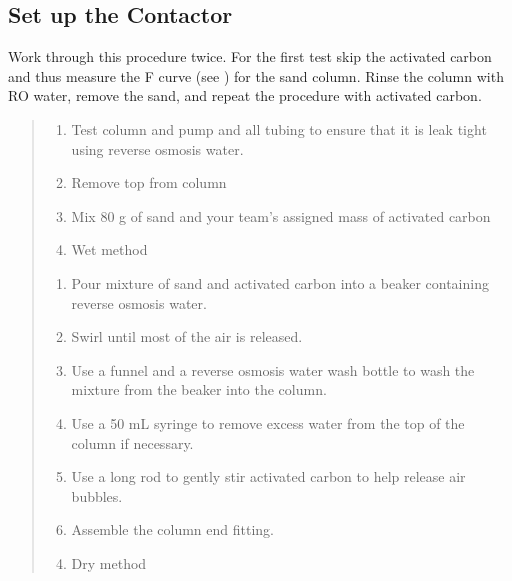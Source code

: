 \documentclass[letterpaper,10pt,english]{sphinxmanual}
\begin{document}
\subsection{Set up the Contactor}
\label{\detokenize{Adsorption/Adsorption:set-up-the-contactor}}
Work through this procedure twice. For the first test skip the activated carbon and thus measure the F curve (see {\hyperref[\detokenize{Reactor_Characteristics/Reactor_Characteristics:heading-reactor-modeling}]{}}) for the sand column. Rinse the column with RO water, remove the sand, and repeat the procedure with activated carbon.
\begin{quote}
\begin{enumerate}
\item {} 
Test column and pump and all tubing to ensure that it is leak tight using reverse osmosis water.

\item {} 
Remove top from column

\item {} 
Mix 80 g of sand and your team’s assigned mass of activated carbon

\item {} 
Wet method

\end{enumerate}
\begin{enumerate}
\item {} 
Pour mixture of sand and activated carbon into a beaker containing reverse osmosis water.

\item {} 
Swirl until most of the air is released.

\item {} 
Use a funnel and a reverse osmosis water wash bottle to wash the mixture from the beaker into the column.

\item {} 
Use a 50 mL syringe to remove excess water from the top of the column if necessary.

\item {} 
Use a long rod to gently stir activated carbon to help release air bubbles.

\item {} 
Assemble the column end fitting.

\end{enumerate}
\begin{enumerate}
\setcounter{enumi}{3}
\item {} 
Dry method


\end{enumerate}
\end{quote}
\end{document}
